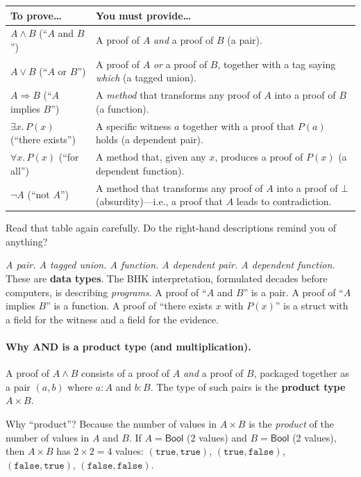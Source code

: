 \documentclass[11pt,a4paper]{article}
\theoremstyle{definition}
\begin{document}
\begin{center}
\renewcommand{\arraystretch}{1.4}
\begin{tabular}{lp{9cm}}
\textbf{To prove\ldots} & \textbf{You must provide\ldots} \\
\hline
$A \land B$ (``$A$ and $B$'') & A proof of $A$ \emph{and} a proof of $B$
  (a pair). \\
$A \lor B$ (``$A$ or $B$'') & A proof of $A$ \emph{or} a proof of $B$,
  together with a tag saying \emph{which} (a tagged union). \\
$A \Rightarrow B$ (``$A$ implies $B$'') & A \emph{method} that transforms any
  proof of $A$ into a proof of $B$ (a function). \\
$\exists x.\, P(x)$ (``there exists'') & A specific witness $a$ together with
  a proof that $P(a)$ holds (a dependent pair). \\
$\forall x.\, P(x)$ (``for all'') & A method that, given any $x$, produces a
  proof of $P(x)$ (a dependent function). \\
$\lnot A$ (``not $A$'') & A method that transforms any proof of $A$ into a
  proof of $\bot$ (absurdity)---i.e., a proof that $A$ leads to contradiction. \\
\end{tabular}
\end{center}

Read that table again carefully. Do the right-hand descriptions remind you of
anything?

\emph{A pair. A tagged union. A function. A dependent pair. A dependent
function.} These are \textbf{data types}. The BHK interpretation, formulated
decades before computers, is describing \emph{programs}. A proof of
``$A$ and $B$'' is a pair. A proof of ``$A$ implies $B$'' is a function. A
proof of ``there exists $x$ with $P(x)$'' is a struct with a field for the
witness and a field for the evidence.

\paragraph{Why AND is a product type (and multiplication).}
A proof of $A \land B$ consists of a proof of $A$ \emph{and} a proof of $B$,
packaged together as a pair $(a, b)$ where $a : A$ and $b : B$. The type of
such pairs is the \textbf{product type} $A \times B$.

Why ``product''? Because the number of values in $A \times B$ is the
\emph{product} of the number of values in $A$ and $B$. If
$A = \textsf{Bool}$ (2 values) and $B = \textsf{Bool}$ (2 values), then
$A \times B$ has $2 \times 2 = 4$ values:
$(\texttt{true},\texttt{true})$,
$(\texttt{true},\texttt{false})$,
$(\texttt{false},\texttt{true})$,
$(\texttt{false},\texttt{false})$.
\end{document}
